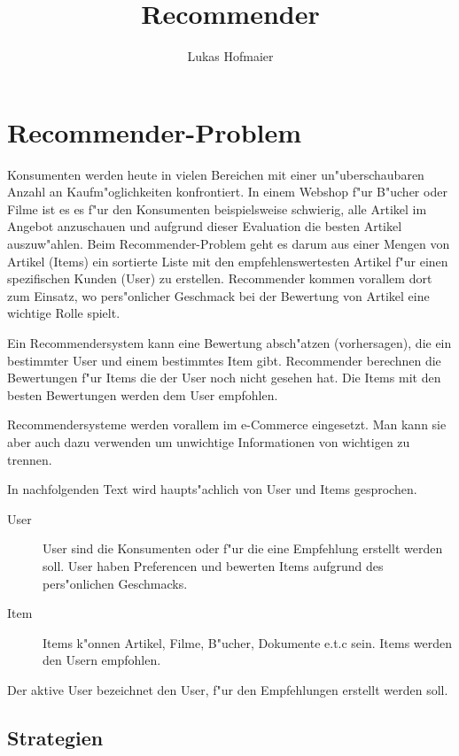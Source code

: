 \documentclass[a4paper, 11pt]{article}
\author{Lukas Hofmaier}
\title{Recommender}
\begin{document}
\lstset{basicstyle=\small,
language=Haskell,
stringstyle=ttfamiliy
}

\maketitle

\tableofcontents

\section{Recommender-Problem}
\label{sec:problem}

Konsumenten werden heute in vielen Bereichen mit einer un"uberschaubaren Anzahl an Kaufm"oglichkeiten konfrontiert. In einem Webshop f"ur B"ucher oder Filme ist es es f"ur den Konsumenten beispielsweise schwierig, alle Artikel im Angebot anzuschauen und aufgrund dieser Evaluation die besten Artikel auszuw"ahlen. Beim Recommender-Problem geht es darum aus einer Mengen von Artikel (Items) ein sortierte Liste mit den empfehlenswertesten Artikel f"ur einen spezifischen Kunden (User) zu erstellen. Recommender kommen vorallem dort zum Einsatz, wo pers"onlicher Geschmack bei der Bewertung von Artikel eine wichtige Rolle spielt.

Ein Recommendersystem kann eine Bewertung absch"atzen (vorhersagen), die ein bestimmter User und einem bestimmtes Item gibt. Recommender berechnen die Bewertungen f"ur Items die der User noch nicht gesehen hat. Die Items mit den besten Bewertungen werden dem User empfohlen.

Recommendersysteme werden vorallem im e-Commerce eingesetzt. Man kann sie aber auch dazu verwenden um unwichtige Informationen von wichtigen zu trennen.

In nachfolgenden Text wird haupts"achlich von User und Items gesprochen. 

\begin{description}
\item[User] User sind die Konsumenten oder f"ur die eine Empfehlung erstellt werden soll. 
User haben Preferencen und bewerten Items aufgrund des pers"onlichen Geschmacks. 
\item[Item] 
Items k"onnen Artikel, Filme, B"ucher, Dokumente e.t.c sein. Items werden den Usern empfohlen.
\end{description}

Der aktive User bezeichnet den User, f"ur den Empfehlungen erstellt werden soll.

\subsection{Strategien}
\label{sec:strategies}
\end{document}
